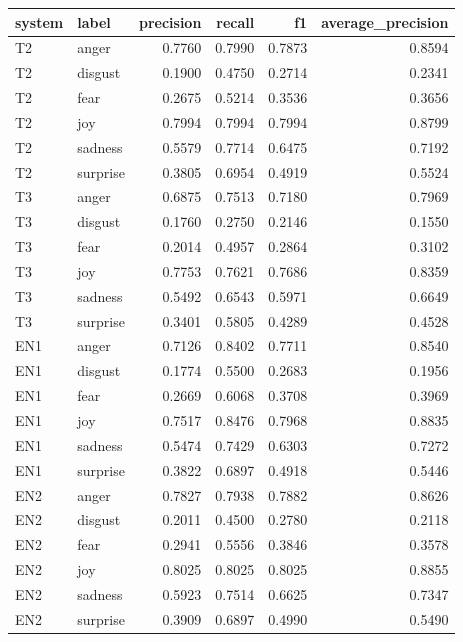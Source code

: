\begin{tabular}{llrrrr}
\toprule
system & label & precision & recall & f1 & average_precision \\
\midrule
T2 & anger & 0.7760 & 0.7990 & 0.7873 & 0.8594 \\
T2 & disgust & 0.1900 & 0.4750 & 0.2714 & 0.2341 \\
T2 & fear & 0.2675 & 0.5214 & 0.3536 & 0.3656 \\
T2 & joy & 0.7994 & 0.7994 & 0.7994 & 0.8799 \\
T2 & sadness & 0.5579 & 0.7714 & 0.6475 & 0.7192 \\
T2 & surprise & 0.3805 & 0.6954 & 0.4919 & 0.5524 \\
T3 & anger & 0.6875 & 0.7513 & 0.7180 & 0.7969 \\
T3 & disgust & 0.1760 & 0.2750 & 0.2146 & 0.1550 \\
T3 & fear & 0.2014 & 0.4957 & 0.2864 & 0.3102 \\
T3 & joy & 0.7753 & 0.7621 & 0.7686 & 0.8359 \\
T3 & sadness & 0.5492 & 0.6543 & 0.5971 & 0.6649 \\
T3 & surprise & 0.3401 & 0.5805 & 0.4289 & 0.4528 \\
EN1 & anger & 0.7126 & 0.8402 & 0.7711 & 0.8540 \\
EN1 & disgust & 0.1774 & 0.5500 & 0.2683 & 0.1956 \\
EN1 & fear & 0.2669 & 0.6068 & 0.3708 & 0.3969 \\
EN1 & joy & 0.7517 & 0.8476 & 0.7968 & 0.8835 \\
EN1 & sadness & 0.5474 & 0.7429 & 0.6303 & 0.7272 \\
EN1 & surprise & 0.3822 & 0.6897 & 0.4918 & 0.5446 \\
EN2 & anger & 0.7827 & 0.7938 & 0.7882 & 0.8626 \\
EN2 & disgust & 0.2011 & 0.4500 & 0.2780 & 0.2118 \\
EN2 & fear & 0.2941 & 0.5556 & 0.3846 & 0.3578 \\
EN2 & joy & 0.8025 & 0.8025 & 0.8025 & 0.8855 \\
EN2 & sadness & 0.5923 & 0.7514 & 0.6625 & 0.7347 \\
EN2 & surprise & 0.3909 & 0.6897 & 0.4990 & 0.5490 \\
\bottomrule
\end{tabular}
